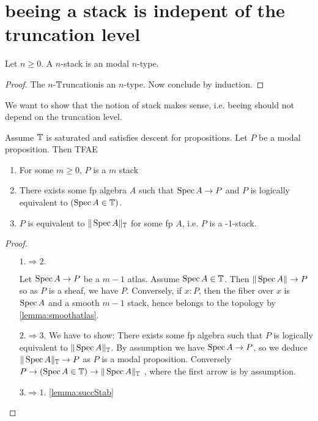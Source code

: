 \documentclass{article}
\newcommand{\truncation}{$\bT$runcation}
\newcommand{\red}[1]{{\color{red} #1}}
\begin{document}
\section{ beeing a stack is indepent of the truncation level}


\begin{lemma}
    Let $n \ge 0$. A  $n$-stack is an modal $n$-type.
\end{lemma}
\begin{proof}
     The $n$-\truncation is an $n$-type. Now conclude by induction.
\end{proof}
We want to show that the notion of  stack makes sense, i.e. beeing  should not depend on the truncation level. 

\begin{lemma}{\label{lemma:prop0stacks}}
     Assume $\mathbb{T}$ is saturated and satisfies descent for propositions. Let $P$ be a modal proposition. Then TFAE 
     \begin{enumerate}
         \item For some $m \ge 0$, $P$ is a  $m$ stack 

         \item There exists some fp algebra $A$ such that $\operatorname{Spec} A \to P$ and $P$ is logically equivalent to $(\operatorname{Spec} A \in \mathbb{T})$.
         \item $P$ is equivalent to $\| \operatorname{Spec} A \|_{\mathbb{T}}$ for some fp $A$, i.e. $P$ is a  -1-stack.
     \end{enumerate}
     
     
\end{lemma}
\begin{proof}
\
    \begin{itemize}
        \item[$1.\Rightarrow 2.$]
    
     Let $\operatorname{Spec} A \to P$ be a $m-1$ atlas. Assume $\operatorname{Spec} A \in \mathbb{T}$. Then $\|\operatorname{Spec} A\| \to P$ so as $P$ is a sheaf, we have $P$. Conversely, if $x : P$, then the fiber over $x$ is $\operatorname{Spec} A$ and a smooth $m-1$ stack, hence belongs to the topology by \ref{lemma:smoothatlas}. 
     \item[$2. \Rightarrow 3.$]
        \red{We have to show: There exists some fp algebra such that $P$ is logically equivalent to $\|\operatorname{Spec} A\|_{\mathbb{T}}$. }        
        By assumption we have $\operatorname{Spec} A \to P$, so we deduce $\|\operatorname{Spec} A\|_{\mathbb{T}} \to P$ as $P$ is a modal proposition. Conversely $P \to (\operatorname{Spec} A \in \mathbb{T}) \to \|\operatorname{Spec} A\|_{\mathbb{T}}$ , where the first arrow is by assumption.
        \item [$3. \Rightarrow 1.$] \ref{lemma:succStab}
     \end{itemize}
\end{proof}
\end{document}

